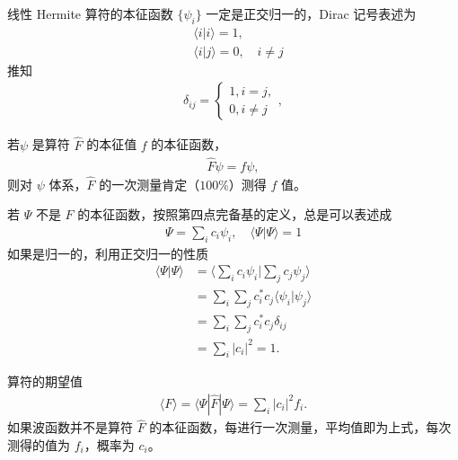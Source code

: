 \begin{theorem}[a]
    线性 Hermite 算符的本征函数 $\{\psi_i\}$ 一定是正交归一的，Dirac 记号表述为
\begin{align}
    &\langle i | i \rangle = 1, \\
    &\langle i | j \rangle = 0, \quad i \neq j
\end{align}
推知
\begin{eqnarray}
    \delta_{ij} = 
    \left\{
        \begin{matrix}
            1, i=j,\\
            0, i\neq j
        \end{matrix}
    \right.,
\end{eqnarray}
\end{theorem}

\begin{theorem}[b]
    若$\psi$ 是算符 $\hat F$ 的本征值 $f$ 的本征函数，
\begin{eqnarray}
    \hat F \psi = f \psi,
\end{eqnarray}
则对 $\psi$ 体系，$\hat F$ 的一次测量肯定（$100\%$）测得 $f$ 值。
\end{theorem}

\begin{theorem}[c]
若 $\Psi$ 不是 $F$ 的本征函数，按照第四点完备基的定义，总是可以表述成
\begin{eqnarray}
    \Psi = \sum_i c_i \psi_i, \quad\langle \Psi | \Psi \rangle = 1
\end{eqnarray}
如果是归一的，利用正交归一的性质
\begin{align}
    \langle \Psi | \Psi \rangle &= \Big\langle \sum_i c_i \psi_i \Big| \sum_j c_j \psi_j \Big\rangle \\
    &= \sum_i \sum_j c_i^* c_j \langle \psi_i | \psi_j \rangle \\
    &= \sum_i \sum_j c_i^* c_j \delta_{ij} \\
    &= \sum_i |c_i|^2 = 1.
\end{align}
\end{theorem}
算符的期望值
\begin{eqnarray}
    \langle F\rangle = \langle \Psi | \hat F | \Psi \rangle = \sum_i |c_i|^2 f_i. 
\end{eqnarray}
如果波函数并不是算符 $\hat F$ 的本征函数，每进行一次测量，平均值即为上式，每次测得的值为 $f_i$，概率为 $c_i$。

